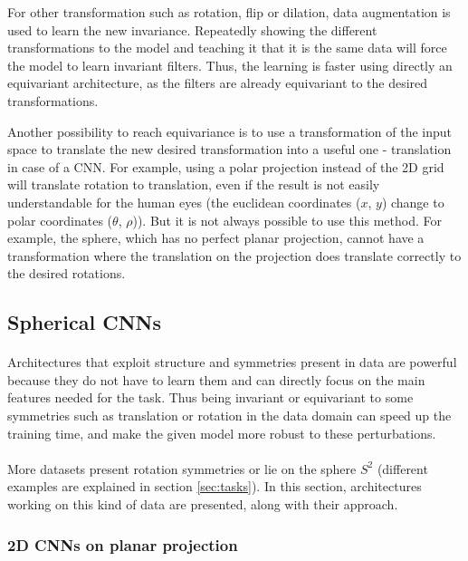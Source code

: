 \documentclass[11pt]{report}
\begin{document}
For other transformation such as rotation, flip or dilation, data augmentation is used to learn the new invariance. Repeatedly showing the different transformations to the model and teaching it that it is the same data will force the model to learn invariant filters. Thus, the learning is faster using directly an equivariant architecture, as the filters are already equivariant to the desired transformations.

Another possibility to reach equivariance is to use a transformation of the input space to translate the new desired transformation into a useful one - translation in case of a CNN. For example, using a polar projection instead of the 2D grid will translate rotation to translation, even if the result is not easily understandable for the human eyes (the euclidean coordinates ($x$, $y$) change to polar coordinates ($\theta$, $\rho$)). But it is not always possible to use this method. For example, the sphere, which has no perfect planar projection, cannot have a transformation where the translation on the projection does translate correctly to the desired rotations.

\subsection{Spherical CNNs}
\paragraph*{}
Architectures that exploit structure and symmetries present in data are powerful because they do not have to learn them and can directly focus on the main features needed for the task. Thus being invariant or equivariant to some symmetries such as translation or rotation in the data domain can speed up the training time, and make the given model more robust to these perturbations.
\paragraph*{}
More datasets present rotation symmetries or lie on the sphere $S^2$ (different examples are explained in section \ref{sec:tasks}). In this section, architectures working on this kind of data are presented, along with their approach.
\subsubsection*{2D CNNs on planar projection}\label{sec:2DSCNN}
\end{document}
